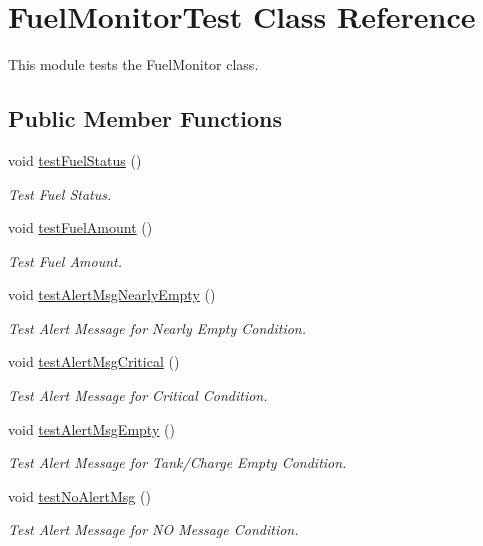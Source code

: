 \hypertarget{class_fuel_monitor_test}{}\section{Fuel\+Monitor\+Test Class Reference}
\label{class_fuel_monitor_test}


This module tests the Fuel\+Monitor class.  


\subsection*{Public Member Functions}
\begin{DoxyCompactItemize}
\item 
void \hyperlink{class_fuel_monitor_test_a0d06ee3111c46f0910f365f9203754cb}{test\+Fuel\+Status} ()
\begin{DoxyCompactList}\small\item\em Test Fuel Status. \end{DoxyCompactList}\item 
void \hyperlink{class_fuel_monitor_test_ad6275a6a3f2d2162265fe2c8b65bcac2}{test\+Fuel\+Amount} ()
\begin{DoxyCompactList}\small\item\em Test Fuel Amount. \end{DoxyCompactList}\item 
void \hyperlink{class_fuel_monitor_test_a6e8a170a57d1a3f588855cbef42893a9}{test\+Alert\+Msg\+Nearly\+Empty} ()
\begin{DoxyCompactList}\small\item\em Test Alert Message for Nearly Empty Condition. \end{DoxyCompactList}\item 
void \hyperlink{class_fuel_monitor_test_ad6b54c87450464b8e7f6347563f98b5a}{test\+Alert\+Msg\+Critical} ()
\begin{DoxyCompactList}\small\item\em Test Alert Message for Critical Condition. \end{DoxyCompactList}\item 
void \hyperlink{class_fuel_monitor_test_ac6d21db32ad7329b2e82eb933bf4b13f}{test\+Alert\+Msg\+Empty} ()
\begin{DoxyCompactList}\small\item\em Test Alert Message for Tank/\+Charge Empty Condition. \end{DoxyCompactList}\item 
void \hyperlink{class_fuel_monitor_test_a126c9a1f9b1acb8310a99c9dcb0ce56c}{test\+No\+Alert\+Msg} ()
\begin{DoxyCompactList}\small\item\em Test Alert Message for N\+O Message Condition. \end{DoxyCompactList}\end{DoxyCompactItemize}
